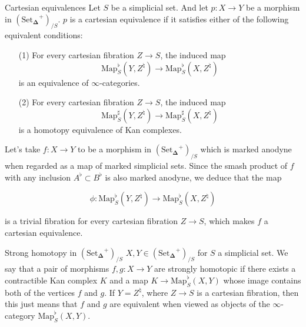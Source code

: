 \documentclass{beamer}[9pt]
\newcommand{\8}{\ensuremath{\infty}}
\newcommand{\SSet}{\ensuremath{\text{Set}_{\boldsymbol{\Delta}}}}
\newcommand{\Map}{\ensuremath{\text{Map}}}
\begin{document}
\begin{frame}{Cartesian equivalences}
  Let $S$ be a simplicial set. And let $p: X \rightarrow Y$ be a morphism in $(\SSet^+)_{/S}$. $p$ is a cartesian equivalence if it satisfies either of the following equivalent conditions:

  \begin{itemize}
    \item[(1)] For every cartesian fibration $Z \rightarrow S$, the induced map
          $$
            \Map^\flat_S(Y, Z^\natural) \rightarrow \Map_S^\flat(X, Z^\natural)
          $$
          is an equivalence of \8-categories.
  \end{itemize}
\end{frame}

\begin{frame}
  \begin{itemize}
    \item[(2)] For every cartesian fibration $Z \rightarrow S$, the induced map
          $$
            \Map^\sharp_S(Y, Z^\natural) \rightarrow \Map_S^\sharp(X, Z^\natural)
          $$
          is a homotopy equivalence of Kan complexes.
  \end{itemize}
\end{frame}

\begin{frame}
  Let's take $f: X \rightarrow Y$ to be a morphism in $(\SSet^+)_{/S}$ which is marked anodyne when regarded as a map of marked simplicial sets. Since the smash product of $f$ with any inclusion $A^\flat\subset B^\flat$ is also marked anodyne, we deduce that the map

  $$
    \phi: \Map_S^\flat(Y, Z^\natural) \rightarrow \Map_S^\flat(X, Z^\natural)
  $$

  is a trivial fibration for every cartesian fibration $Z \rightarrow S$, which makes $f$ a cartesian equivalence.
\end{frame}

\begin{frame}{Strong homotopy in $(\SSet^+)_{/S}$}
  $X, Y \in (\SSet^+)_{/S}$ for $S$ a simplicial set. We say that a pair of morphisms $f, g: X \rightarrow Y$ are strongly homotopic if there exists a contractible Kan complex $K$ and a map $K \rightarrow \Map^\flat_S(X, Y)$ whose image contains both of the vertices $f$ and $g$. If $Y = Z^\natural$, where $Z \rightarrow S$ is a cartesian fibration, then this just means that $f$ and $g$ are equivalent when viewed as objects of the \8-category $\Map_S^\flat(X, Y)$.
\end{frame}
\end{document}
